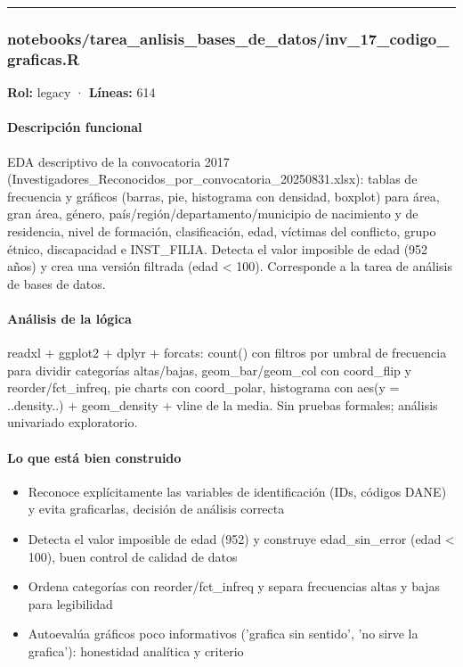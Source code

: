 \medskip
\hrule

\subsubsection{notebooks/tarea\_anlisis\_bases\_de\_datos/inv\_17\_codigo\_graficas.R}
\textbf{Rol:} legacy · \textbf{Líneas:} 614

\paragraph{Descripción funcional}
EDA descriptivo de la convocatoria 2017 (Investigadores\_Reconocidos\_por\_convocatoria\_20250831.xlsx): tablas de frecuencia y gráficos (barras, pie, histograma con densidad, boxplot) para área, gran área, género, país/región/departamento/municipio de nacimiento y de residencia, nivel de formación, clasificación, edad, víctimas del conflicto, grupo étnico, discapacidad e INST\_FILIA. Detecta el valor imposible de edad (952 años) y crea una versión filtrada (edad < 100). Corresponde a la tarea de análisis de bases de datos.

\paragraph{Análisis de la lógica}
readxl + ggplot2 + dplyr + forcats: count() con filtros por umbral de frecuencia para dividir categorías altas/bajas, geom\_bar/geom\_col con coord\_flip y reorder/fct\_infreq, pie charts con coord\_polar, histograma con aes(y = ..density..) + geom\_density + vline de la media. Sin pruebas formales; análisis univariado exploratorio.

\paragraph{Lo que está bien construido}
\begin{itemize}
  \item Reconoce explícitamente las variables de identificación (IDs, códigos DANE) y evita graficarlas, decisión de análisis correcta
  \item Detecta el valor imposible de edad (952) y construye edad\_sin\_error (edad < 100), buen control de calidad de datos
  \item Ordena categorías con reorder/fct\_infreq y separa frecuencias altas y bajas para legibilidad
  \item Autoevalúa gráficos poco informativos ('grafica sin sentido', 'no sirve la grafica'): honestidad analítica y criterio
\end{itemize}

